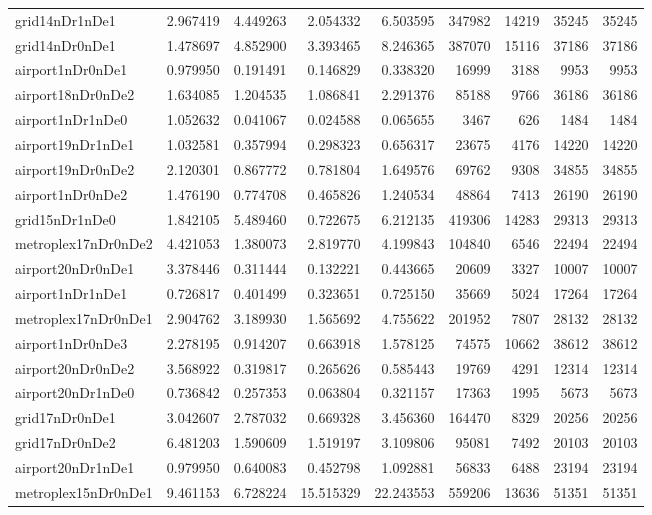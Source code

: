 \begin{longtable}{|l|r|r|r|r|r|r|r|r|}
grid14nDr1nDe1 & 2.967419 & 4.449263 & 2.054332 & 6.503595 & 347982 & 14219 & 35245 & 35245 \\
grid14nDr0nDe1 & 1.478697 & 4.852900 & 3.393465 & 8.246365 & 387070 & 15116 & 37186 & 37186 \\
airport1nDr0nDe1 & 0.979950 & 0.191491 & 0.146829 & 0.338320 & 16999 & 3188 & 9953 & 9953 \\
airport18nDr0nDe2 & 1.634085 & 1.204535 & 1.086841 & 2.291376 & 85188 & 9766 & 36186 & 36186 \\
airport1nDr1nDe0 & 1.052632 & 0.041067 & 0.024588 & 0.065655 & 3467 & 626 & 1484 & 1484 \\
airport19nDr1nDe1 & 1.032581 & 0.357994 & 0.298323 & 0.656317 & 23675 & 4176 & 14220 & 14220 \\
airport19nDr0nDe2 & 2.120301 & 0.867772 & 0.781804 & 1.649576 & 69762 & 9308 & 34855 & 34855 \\
airport1nDr0nDe2 & 1.476190 & 0.774708 & 0.465826 & 1.240534 & 48864 & 7413 & 26190 & 26190 \\
grid15nDr1nDe0 & 1.842105 & 5.489460 & 0.722675 & 6.212135 & 419306 & 14283 & 29313 & 29313 \\
metroplex17nDr0nDe2 & 4.421053 & 1.380073 & 2.819770 & 4.199843 & 104840 & 6546 & 22494 & 22494 \\
airport20nDr0nDe1 & 3.378446 & 0.311444 & 0.132221 & 0.443665 & 20609 & 3327 & 10007 & 10007 \\
airport1nDr1nDe1 & 0.726817 & 0.401499 & 0.323651 & 0.725150 & 35669 & 5024 & 17264 & 17264 \\
metroplex17nDr0nDe1 & 2.904762 & 3.189930 & 1.565692 & 4.755622 & 201952 & 7807 & 28132 & 28132 \\
airport1nDr0nDe3 & 2.278195 & 0.914207 & 0.663918 & 1.578125 & 74575 & 10662 & 38612 & 38612 \\
airport20nDr0nDe2 & 3.568922 & 0.319817 & 0.265626 & 0.585443 & 19769 & 4291 & 12314 & 12314 \\
airport20nDr1nDe0 & 0.736842 & 0.257353 & 0.063804 & 0.321157 & 17363 & 1995 & 5673 & 5673 \\
grid17nDr0nDe1 & 3.042607 & 2.787032 & 0.669328 & 3.456360 & 164470 & 8329 & 20256 & 20256 \\
grid17nDr0nDe2 & 6.481203 & 1.590609 & 1.519197 & 3.109806 & 95081 & 7492 & 20103 & 20103 \\
airport20nDr1nDe1 & 0.979950 & 0.640083 & 0.452798 & 1.092881 & 56833 & 6488 & 23194 & 23194 \\
metroplex15nDr0nDe1 & 9.461153 & 6.728224 & 15.515329 & 22.243553 & 559206 & 13636 & 51351 & 51351 \\

\end{longtable}
